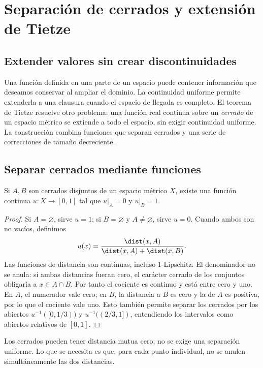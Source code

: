 \chapter{Separación de cerrados y extensión de Tietze}\label{chap:12}
\section{Extender valores sin crear discontinuidades}
Una función definida en una parte de un espacio puede contener información que deseamos conservar al ampliar el dominio. La continuidad uniforme permite extenderla a una clausura cuando el espacio de llegada es completo. El teorema de Tietze resuelve otro problema: una función real continua sobre un \emph{cerrado} de un espacio métrico se extiende a todo el espacio, sin exigir continuidad uniforme. La construcción combina funciones que separan cerrados y una serie de correcciones de tamaño decreciente.

\section{Separar cerrados mediante funciones}
\begin{teorema}\label{ch12:urysohn}
Si $A,B$ son cerrados disjuntos de un espacio métrico $X$, existe una función continua $u:X\to[0,1]$ tal que $u|_A=0$ y $u|_B=1$.
\end{teorema}
\begin{proof}
Si $A=\varnothing$, sirve $u=1$; si $B=\varnothing$ y $A\ne\varnothing$, sirve $u=0$. Cuando ambos son no vacíos, definimos
\[
 u(x)=\frac{\dist(x,A)}{\dist(x,A)+\dist(x,B)}.
\]
Las funciones de distancia son continuas, incluso $1$-Lipschitz. El denominador no se anula: si ambas distancias fueran cero, el carácter cerrado de los conjuntos obligaría a $x\in A\cap B$. Por tanto el cociente es continuo y está entre cero y uno. En $A$, el numerador vale cero; en $B$, la distancia a $B$ es cero y la de $A$ es positiva, por lo que el cociente vale uno. Esto también permite separar los cerrados por los abiertos $u^{-1}([0,1/3))$ y $u^{-1}((2/3,1])$, entendiendo los intervalos como abiertos relativos de $[0,1]$.
\end{proof}
Los cerrados pueden tener distancia mutua cero; no se exige una separación uniforme. Lo que se necesita es que, para cada punto individual, no se anulen simultáneamente las dos distancias.

